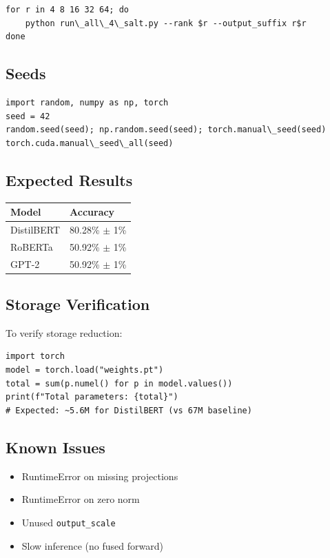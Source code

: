 \begin{lstlisting}
for r in 4 8 16 32 64; do
    python run\_all\_4\_salt.py --rank $r --output_suffix r$r
done
\end{lstlisting}

\subsection{Seeds}

\begin{lstlisting}
import random, numpy as np, torch
seed = 42
random.seed(seed); np.random.seed(seed); torch.manual\_seed(seed)
torch.cuda.manual\_seed\_all(seed)
\end{lstlisting}

\subsection{Expected Results}

\begin{table}[H]
\centering
\small
\begin{tabular}{ll}
\toprule
\textbf{Model} & \textbf{Accuracy} \\
\midrule
DistilBERT & 80.28\% $\pm$ 1\% \\
RoBERTa & 50.92\% $\pm$ 1\% \\
GPT-2 & 50.92\% $\pm$ 1\% \\
\bottomrule
\end{tabular}
\end{table}

\subsection{Storage Verification}

To verify storage reduction:

\begin{lstlisting}
import torch
model = torch.load("weights.pt")
total = sum(p.numel() for p in model.values())
print(f"Total parameters: {total}")
# Expected: ~5.6M for DistilBERT (vs 67M baseline)
\end{lstlisting}

\subsection{Known Issues}

\begin{itemize}
\item RuntimeError on missing projections
\item RuntimeError on zero norm
\item Unused \texttt{output\_scale}
\item Slow inference (no fused forward)

\end{itemize}
